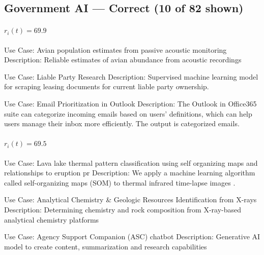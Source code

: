 \subsection{Government AI --- Correct (10 of 82 shown)}
\label{app:triplets-gov-ai-correct}

\paragraph{$r_i(t) = 69.9$}
\begin{description}[style=nextline,leftmargin=1em,font=\normalfont\bfseries]
  \item[Anchor] Use Case: Avian population estimates from passive acoustic monitoring
Description: Reliable estimates of avian abundance from acoustic recordings
  \item[Human-judged closer] Use Case: Liable Party Research
Description: Supervised machine learning model for scraping leasing documents for current liable party ownership.
  \item[Human-judged farther] Use Case: Email Prioritization in Outlook
Description: The Outlook in Office365 suite can categorize incoming emails based on users' definitions, which can help users manage their inbox more efficiently. The output is categorized emails.
\end{description}
\paragraph{$r_i(t) = 69.5$}
\begin{description}[style=nextline,leftmargin=1em,font=\normalfont\bfseries]
  \item[Anchor] Use Case: Lava lake thermal pattern classification using self organizing maps and relationships to eruption pr
Description: We apply a machine learning algorithm called self-organizing maps (SOM) to thermal infrared time-lapse images .
  \item[Human-judged closer] Use Case: Analytical Chemistry \& Geologic Resources Identification from X-rays
Description:   Determining chemistry and rock composition from X-ray-based analytical chemistry platforms
  \item[Human-judged farther] Use Case: Agency Support Companion (ASC) chatbot
Description: Generative AI model to create content, summarization and research capabilities
\end{description}

